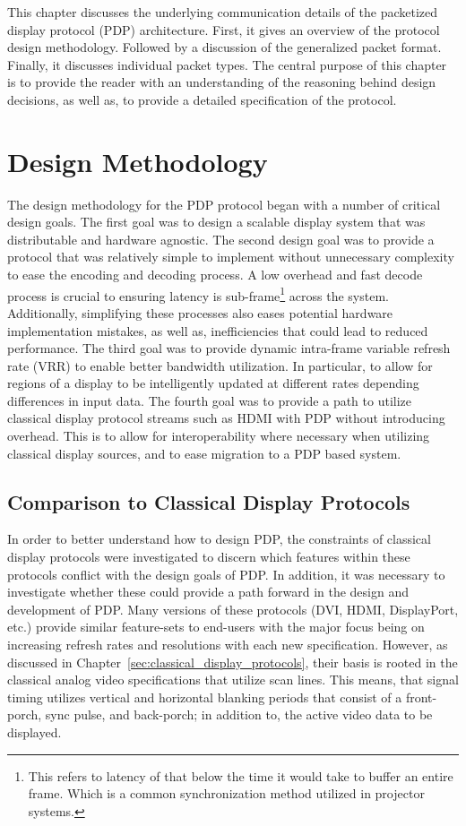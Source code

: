 \label{chap:pdp_protocol}

This chapter discusses the underlying communication details of the packetized display protocol (PDP) architecture. First, it gives an overview of the protocol design methodology. Followed by a discussion of the generalized packet format. Finally, it discusses individual packet types. The central purpose of this chapter is to provide the reader with an understanding of the reasoning behind design decisions, as well as, to provide a detailed specification of the protocol.

\section{Design Methodology}
    The design methodology for the PDP protocol began with a number of critical design goals. The first goal was to design a scalable display system that was distributable and hardware agnostic. The second design goal was to provide a protocol that was relatively simple to implement without unnecessary complexity to ease the encoding and decoding process. A low overhead and fast decode process is crucial to ensuring latency is sub-frame\footnote{This refers to latency of that below the time it would take to buffer an entire frame. Which is a common synchronization method utilized in projector systems.} across the system. Additionally, simplifying these processes also eases potential hardware implementation mistakes, as well as, inefficiencies that could lead to reduced performance. The third goal was to provide dynamic intra-frame variable refresh rate (VRR) to enable better bandwidth utilization. In particular, to allow for regions of a display to be intelligently updated at different rates depending differences in input data. The fourth goal was to provide a path to utilize classical display protocol streams such as HDMI with PDP without introducing overhead. This is to allow for interoperability where necessary when utilizing classical display sources, and to ease migration to a PDP based system.

    \subsection{Comparison to Classical Display Protocols}
        In order to better understand how to design PDP, the constraints of classical display protocols were investigated to discern which features within these protocols conflict with the design goals of PDP. In addition, it was necessary to investigate whether these could provide a path forward in the design and development of PDP. Many versions of these protocols (DVI\cite{DDWG1999}, HDMI\cite{HDMIForum2018}, DisplayPort\cite{VESA2016}, etc.) provide similar feature-sets to end-users with the major focus being on increasing refresh rates and resolutions with each new specification. However, as discussed in Chapter~\ref{sec:classical_display_protocols}, their basis is rooted in the classical analog video specifications that utilize scan lines\cite{Neal1998}. This means, that signal timing utilizes vertical and horizontal blanking periods that consist of a front-porch, sync pulse, and back-porch; in addition to, the active video data to be displayed.

